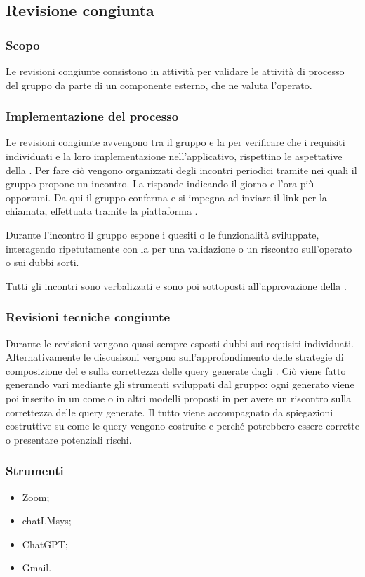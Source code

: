 \subsection{Revisione congiunta}\label{revisione_congiunta}

\subsubsection{Scopo}
\par Le revisioni congiunte consistono in attività per validare le attività di processo del gruppo da parte di un componente esterno, che ne valuta l'operato.

\subsubsection{Implementazione del processo}
\par Le revisioni congiunte avvengono tra il gruppo e la  per verificare che i requisiti individuati e la loro implementazione nell'applicativo, rispettino le aspettative della . Per fare ciò vengono organizzati degli incontri periodici tramite  nei quali il gruppo propone un incontro. La  risponde indicando il giorno e l'ora più opportuni. Da qui il gruppo conferma e si impegna ad inviare il link per la chiamata, effettuata tramite la piattaforma .
\par Durante l'incontro il gruppo espone i quesiti o le funzionalità sviluppate, interagendo ripetutamente con la  per una validazione o un riscontro sull'operato o sui dubbi sorti.
\par Tutti gli incontri sono verbalizzati e sono poi sottoposti all'approvazione della .

\subsubsection{Revisioni tecniche congiunte}
\par Durante le revisioni vengono quasi sempre esposti dubbi sui requisiti individuati. Alternativamente le discusisoni vergono sull'approfondimento delle strategie di composizione del  e sulla correttezza delle query generate dagli . Ciò viene fatto generando vari  mediante gli strumenti sviluppati dal gruppo: ogni  generato viene poi inserito in un  come  o in altri modelli proposti in  per avere un riscontro sulla correttezza delle query generate. Il tutto viene accompagnato da spiegazioni costruttive su come le query vengono costruite e perché potrebbero essere corrette o presentare potenziali rischi.

\subsubsection{Strumenti}
\IntroStrumenti
\begin{itemize}
    \item Zoom;
    \item chatLMsys;
    \item ChatGPT;
    \item Gmail.
\end{itemize}